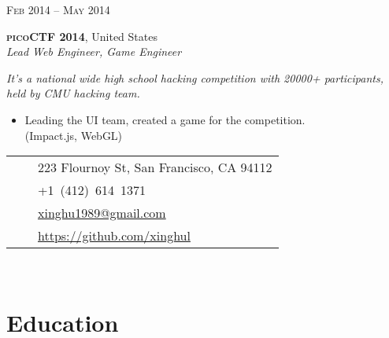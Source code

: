 \documentclass[10pt]{article}
\def\phone{{\FA \faPhone}}
\def\envelope{{\FA \faEnvelope}}
\def\home{{\FA \faHome}}
\def\github{{\FA \faGithub}}
\begin{document}
{\begin{minipage}[t]{0.5\textwidth}
{\raggedleft\textsc{Feb 2014 -- May 2014}\par}

{\raggedright\large \textbf{\textsc{picoCTF 2014}}, United States\\
\textit{Lead Web Engineer, Game Engineer}\\[5pt]}

\textit{It’s a national wide high school hacking competition with 20000+ participants, held by CMU hacking team.}
\begin{itemize}
	\item Leading the UI team, created a game for the competition. \\
	{\color{Mahogany}(Impact.js, WebGL)}
\end{itemize}


\end{minipage} %
\hfill
\begin{minipage}[t]{0.44\textwidth} %
\vspace{0pt} %


\colorbox{shade}{\ttfamily\textcolor{text1}{
\begin{tabular}{@{} m{1cm} r m{4.8cm}}
& \home & 223 Flournoy St, San Francisco, CA 94112 \\ %
& \phone & +1~(412)~614~1371 \\ %
& \envelope & \href{mailto:xinghu1989@gmail.com}{xinghu1989@gmail.com} \\ %
& \github & \href{https://github.com/xinghul}{https://github.com/xinghul} \\ %
\end{tabular}
}
}\\[1pt]


\section{Education} 


\end{minipage}}
\end{document}
